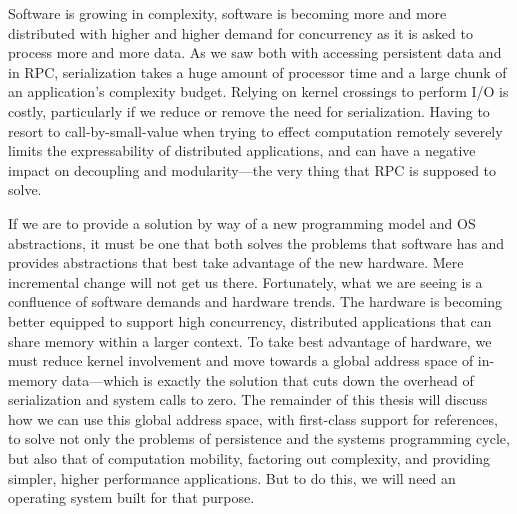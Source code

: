\begin{chconc}



    Software is growing in complexity, software is becoming more and more distributed with higher and higher demand for
    concurrency as it is asked to process more and more data.
    As we saw both with accessing persistent data and in RPC, serialization takes a huge amount of processor time and a
    large chunk of an application's complexity budget. Relying on kernel crossings to perform I/O is costly, particularly if
    we reduce or remove the need for serialization. Having to resort to call-by-small-value when trying to effect
    computation remotely severely limits the expressability of distributed applications, and can have a negative impact on
    decoupling and modularity---the very thing that RPC is supposed to solve.

    If we are to provide a solution by way of a new programming model and OS abstractions, it must be one that both solves
    the problems that software has and provides abstractions that best take advantage of the new hardware. Mere incremental
    change will not get us there. Fortunately, what we are seeing is a confluence of software demands and hardware trends.
    The hardware is becoming better equipped to support high concurrency, distributed applications that can share memory
    within a larger context. To take best advantage of hardware, we must reduce kernel involvement and move towards a global
    address space of in-memory data---which is exactly the solution that cuts down the overhead of serialization and system calls
    to zero. The remainder of this thesis will discuss how we can use this global address space, with first-class support
    for references, to solve not only the problems of persistence and the systems programming cycle, but also that of
    computation mobility, factoring out complexity, and providing simpler, higher performance applications. But to do
    this, we will need an operating system built for that purpose.

\end{chconc}